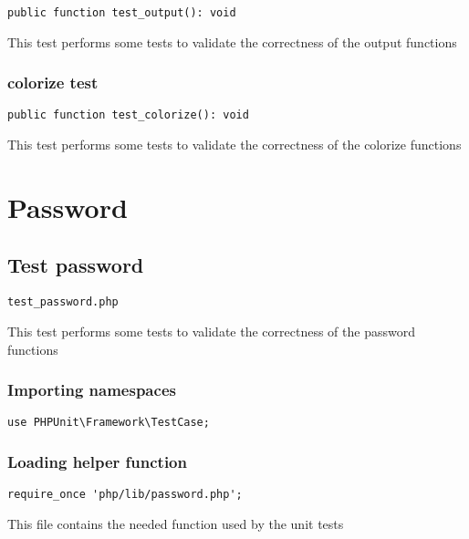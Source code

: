 \documentclass[a4paper]{article}
\begin{document}
\begin{lstlisting}
public function test_output(): void
\end{lstlisting}

This test performs some tests to validate the correctness
of the output functions

\hypertarget{toc313}{}
\subsubsection{colorize test}

\begin{lstlisting}
public function test_colorize(): void
\end{lstlisting}

This test performs some tests to validate the correctness
of the colorize functions


\hypertarget{toc314}{}
\section{Password}

\hypertarget{toc315}{}
\subsection{Test password}

\begin{lstlisting}
test_password.php
\end{lstlisting}

This test performs some tests to validate the correctness
of the password functions

\hypertarget{toc316}{}
\subsubsection{Importing namespaces}

\begin{lstlisting}
use PHPUnit\Framework\TestCase;
\end{lstlisting}

\hypertarget{toc317}{}
\subsubsection{Loading helper function}

\begin{lstlisting}
require_once 'php/lib/password.php';
\end{lstlisting}

This file contains the needed function used by the unit tests
\end{document}
